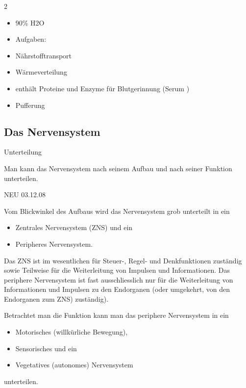 \documentclass{article}
\begin{document}
\begin{multicols}{2}
\begin{itemize}
\item 90\% H2O

\item Aufgaben:

\end{itemize}
\begin{itemize}
\item N\"ahrstofftransport

\item W\"armeverteilung

\end{itemize}
\begin{itemize}
\item enth\"alt Proteine und Enzyme f\"ur  Blutgerinnung (Serum )

\item Pufferung

\end{itemize}
\end{multicols}
\subsection{Das Nervensystem}
Unterteilung

Man kann das Nervensystem nach seinem Aufbau und nach seiner Funktion
unterteilen.

\begin{center}
\begin{minipage}{4.001cm}
NEU 03.12.08

\end{minipage}
\end{center}
Vom Blickwinkel des Aufbaus wird das Nervensystem grob unterteilt in ein


\begin{itemize}
\item Zentrales Nervensystem (ZNS) und ein 

\item Peripheres Nervensystem.

\end{itemize}
Das ZNS ist im wesentlichen f\"ur Steuer-, Regel- und Denkfunktionen
zust\"andig sowie Teilweise f\"ur die Weiterleitung von Impulsen und
Informationen. Das periphere Nervensystem ist fast ausschliesslich nur
f\"ur die Weiterleitung von Informationen und Impulsen zu den
Endorganen (oder umgekehrt, von den Endorganen zum ZNS) zust\"andig). 

Betrachtet man die Funktion kann man das periphere Nervensystem in ein 

\begin{itemize}
\item Motorisches (willk\"urliche Bewegung),

\item Sensorisches und ein

\item Vegetatives (autonomes) Nervensystem

\end{itemize}
unterteilen. 
\end{document}
